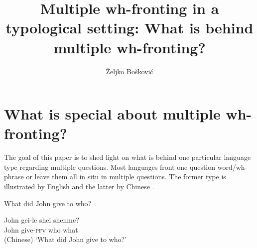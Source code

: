 \documentclass[output=paper,colorlinks,citecolor=brown]{langscibook}
\author{Željko Bošković\affiliation{University of Connecticut}}
\title[Multiple wh-fronting in a typological setting]{Multiple wh-fronting in a typological setting: What is behind multiple wh-fronting?}
\begin{document}
\maketitle

\section{What is special about multiple wh-fronting?}\label{sec:bosk:1}

The goal of this paper is to shed light on what is behind one particular language type regarding multiple questions. Most languages front one question word/wh-phrase or leave them all in situ in multiple questions. The former type is illustrated by English  and the latter by Chinese .

\ea What did John give to who?
\label{ex:bosk:1}
\z

\ea \gll John gei-le shei shenme? \\
John give-\textsc{pfv} who  what\\\hfill(Chinese)
\glt `What did John give to who?' 
\label{ex:bosk:2} 
\z 
\end{document}
